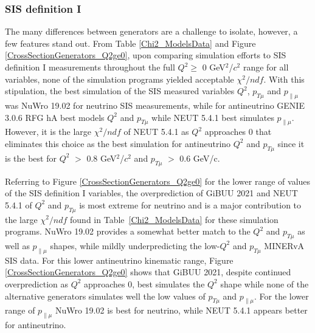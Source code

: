 \documentclass[aps, prd, twocolumn, showpacs, superscriptaddress, floatfix]{revtex4-2}
\begin{document}
\subsubsection{SIS definition I}
The many differences between generators are a challenge to isolate, however, a few features stand out. From Table \ref{Chi2_ModelsData} and Figure \ref{CrossSectionGenerators_Q2ge0}, upon comparing simulation efforts to SIS definition I measurements throughout the full $Q^2 \geq$ 0 GeV$^2$/$c^2$ range for all variables, none of the simulation programs yielded acceptable $\chi^2/ndf$. With this stipulation, the best simulation of the SIS measured variables $Q^2$, $p_{T\mu}$ and $p_{\parallel\mu}$ was NuWro 19.02 for neutrino SIS measurements, while for antineutrino GENIE 3.0.6 RFG hA best models $Q^2$ and $p_{T\mu}$ while NEUT 5.4.1 best simulates $p_{\parallel\mu}$. However, it is the large $\chi^2/ndf$ of NEUT 5.4.1 as $Q^2$ approaches 0 that eliminates this choice as the best simulation for antineutrino $Q^2$ and $p_{T\mu}$ since it is the best for $Q^2$ $>$ 0.8 GeV$^2$/$c^2$ and $p_{T\mu}$ $>$ 0.6 GeV/c. 

Referring to Figure \ref{CrossSectionGenerators_Q2ge0} for the lower range of values of the SIS definition I variables, the overprediction of GiBUU 2021 and NEUT 5.4.1 of $Q^2$ and $p_{T\mu}$ is most extreme for neutrino and is a major contribution to the large $\chi^2/ndf$ found in Table~\ref{Chi2_ModelsData} for these simulation programs. NuWro 19.02 provides a somewhat better match to the $Q^2$ and $p_{T\mu}$ as well as $p_{\parallel\mu}$ shapes, while mildly underpredicting the low-$Q^2$ and $p_{T\mu}$ MINERvA SIS data. For this lower antineutrino kinematic range, Figure \ref{CrossSectionGenerators_Q2ge0} shows that GiBUU 2021, despite continued overprediction as $Q^2$ approaches 0, best simulates the $Q^2$ shape while none of the alternative generators simulates well the low values of $p_{T\mu}$ and $p_{\parallel\mu}$. For the lower range of $p_{\parallel\mu}$ NuWro 19.02 is best for neutrino, while NEUT 5.4.1 appears better for antineutrino.
\end{document}
